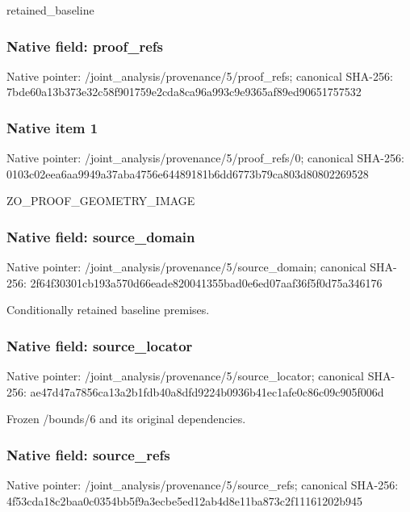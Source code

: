 \documentclass[10pt,a4paper]{article}
\begin{document}
retained\_baseline


\subsubsection{Native field: proof\_refs}


Native pointer: /joint\_analysis/provenance/5/proof\_refs; canonical SHA-256: 7bde60a13b373e32c58f9017\allowbreak{}59e2cda8ca96a993c9e9365a\allowbreak{}f89ed90651757532



\subsubsection{Native item 1}


Native pointer: /joint\_analysis/provenan\allowbreak{}ce/5/proof\_refs/0; canonical SHA-256: 0103c02eea6aa9949a37aba4\allowbreak{}756e64489181b6dd6773b79c\allowbreak{}a803d80802269528


ZO\_PROOF\_GEOMETRY\_IMAGE


\subsubsection{Native field: source\_domain}


Native pointer: /joint\_analysis/provenan\allowbreak{}ce/5/source\_domain; canonical SHA-256: 2f64f30301cb193a570d66ea\allowbreak{}de820041355bad0e6ed07aaf\allowbreak{}36f5f0d75a346176


Conditionally retained baseline premises.


\subsubsection{Native field: source\_locator}


Native pointer: /joint\_analysis/provenan\allowbreak{}ce/5/source\_locator; canonical SHA-256: ae47d47a7856ca13a2b1fdb4\allowbreak{}0a8dfd9224b0936b41ec1afe\allowbreak{}0c86c09c905f006d


Frozen /bounds/6 and its original dependencies.


\subsubsection{Native field: source\_refs}


Native pointer: /joint\_analysis/provenan\allowbreak{}ce/5/source\_refs; canonical SHA-256: 4f53cda18c2baa0c0354bb5f\allowbreak{}9a3ecbe5ed12ab4d8e11ba87\allowbreak{}3c2f11161202b945
\end{document}
